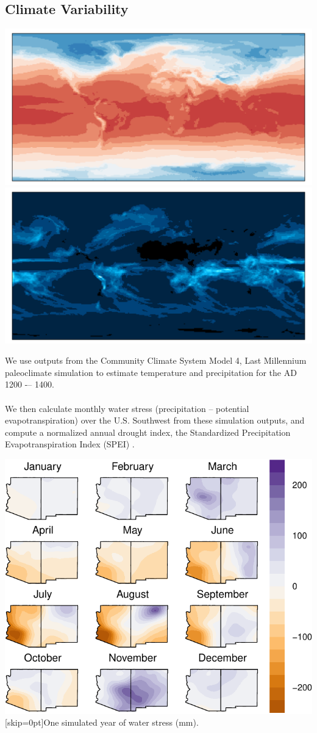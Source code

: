 \documentclass[a0,final]{a0poster}
\begin{document}
\begin{multicols}{3}
\subsection*{Climate Variability}
    \includegraphics[width = .45\columnwidth]{images/ccsm4_temp}
    \includegraphics[width = .45\columnwidth]{images/ccsm4_prec}
\medskip
\begin{multicols}{2}
\vspace*{\fill}
\noindent We use outputs from the Community Climate System Model 4, Last Millennium paleoclimate simulation \cite{Landrum2013LastCCSM4} to estimate temperature and precipitation for the AD 1200 -– 1400.\\
\\
\noindent We then calculate monthly water stress (precipitation -- potential evapotranspiration) over the U.S. Southwest from these simulation outputs, and compute a normalized annual drought index, the Standardized Precipitation Evapotranspiration Index (SPEI) \cite{Begueria2014StandardizedMonitoring}.
\vspace*{\fill}

\columnbreak
\begin{center}    
    \includegraphics[width = .8\columnwidth]{images/water_stress}
    [skip=0pt]{One simulated year of water stress (mm).}
\end{center}
\end{multicols}


\end{multicols}
\end{document}
